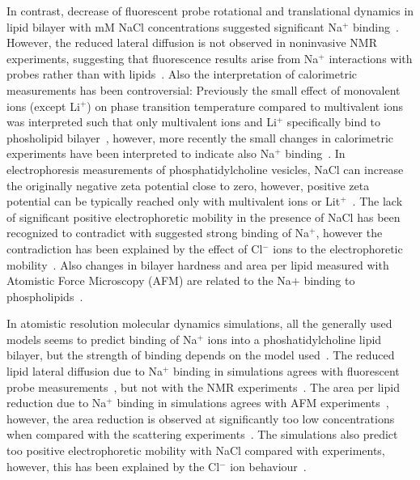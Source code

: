 \documentclass[pre,aps,floatfix,authordate1-4,twocolumn]{revtex4-1}
\begin{document}
In contrast, decrease of fluorescent probe rotational and translational dynamics in lipid bilayer with mM NaCl concentrations
suggested significant Na$^{+}$ binding~\cite{bockmann03,vacha09a,harb13}. However, the reduced lateral diffusion is not observed
in noninvasive NMR experiments, suggesting that fluorescence results arise from Na$^{+}$ interactions with probes rather than with 
lipids~\cite{filippov09}. Also the interpretation of calorimetric measurements has been controversial: Previously the small effect of
monovalent ions (except Li$^+$)  on phase transition temperature compared to multivalent ions was interpreted such that 
only multivalent ions and Li$^+$ specifically bind to phosholipid bilayer~\cite{cevc90}, however, more recently the
small changes in calorimetric experiments have been interpreted to indicate also Na$^+$ binding~\cite{bockmann03,klasczyk10}.
In electrophoresis measurements of phosphatidylcholine vesicles, NaCl can increase the originally negative zeta potential 
close to zero, however, positive zeta potential can be typically reached only with multivalent ions or Lit$^+$~\cite{eisenberg79,tatulian87,manyes05,manyes06,klasczyk10}. The lack of significant positive electrophoretic mobility in the presence
of NaCl has been recognized to contradict with suggested strong binding of Na$^+$, however the contradiction
has been explained by the effect of Cl$^-$ ions to the electrophoretic mobility~\cite{berkowitz06,knecht13}.
Also changes in bilayer hardness and area per lipid measured with Atomistic Force Microscopy (AFM)
are related to the Na$ {+}$ binding to phospholipids~\cite{manyes05,manyes06,fukuma07,ferber11,morata12}.

In atomistic resolution molecular dynamics simulations, all the generally used models seems
to predict binding of Na${^+}$ ions into a phoshatidylcholine lipid bilayer, 
but the strength of binding depends on the model used~\cite{bockmann03,bockmann04,sachs04,berkowitz06,cordomi09,valley11,berkowitz12}. 
The reduced lipid lateral diffusion due to Na$^+$ binding in simulations agrees with 
fluorescent probe measurements~\cite{bockmann03,vacha09a,harb13}, but not with the NMR experiments~\cite{filippov09}.
The area per lipid reduction due to Na$^+$ binding in simulations agrees with AFM 
experiments~\cite{manyes05,manyes06,fukuma07,ferber11,morata12}, however, the area reduction is 
observed at significantly too low concentrations when compared with the scattering experiments~\cite{pabst07}.
The simulations also predict too positive electrophoretic mobility with NaCl compared with experiments, 
however, this has been explained by the Cl$^-$ ion behaviour~\cite{berkowitz06,knecht13}.
\end{document}

